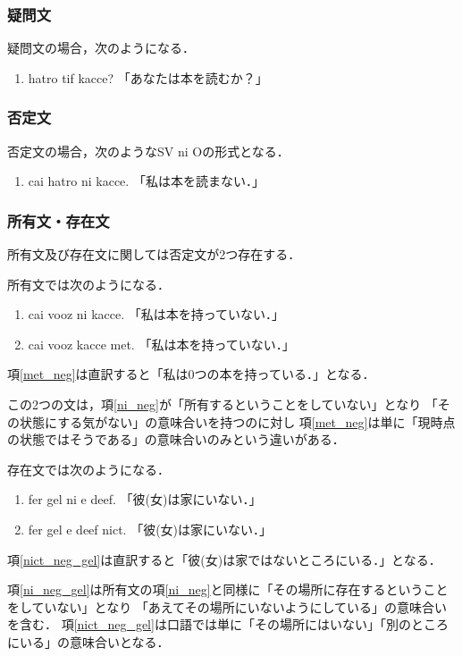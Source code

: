 \documentclass[a4paper,xelatex,ja=standard]{bxjsarticle}
\begin{document}
\subsubsection{疑問文}
疑問文の場合，次のようになる．
\begin{enumerate}
 \item hatro tif kacce? 「あなたは本を読むか？」
\end{enumerate}

\subsubsection{否定文}
否定文の場合，次のようなSV ni Oの形式となる．
\begin{enumerate}
 \item cai hatro ni kacce. 「私は本を読まない．」
\end{enumerate}

\subsubsection{所有文・存在文}
所有文及び存在文に関しては否定文が2つ存在する．

所有文では次のようになる．
\begin{enumerate}
 \item cai vooz ni kacce. 「私は本を持っていない．」 \label{ni_neg}
 \item cai vooz kacce met. 「私は本を持っていない．」\label{met_neg}
\end{enumerate}
項\ref{met_neg}は直訳すると「私は0つの本を持っている．」となる．

この2つの文は，項\ref{ni_neg}が「所有するということをしていない」となり
「その状態にする気がない」の意味合いを持つのに対し
項\ref{met_neg}は単に「現時点の状態ではそうである」の意味合いのみという違いがある．

存在文では次のようになる．
\begin{enumerate}
 \item fer gel ni e deef. 「彼(女)は家にいない．」\label{ni_neg_gel}
 \item fer gel e deef nict. 「彼(女)は家にいない．」\label{nict_neg_gel}
\end{enumerate}
項\ref{nict_neg_gel}は直訳すると「彼(女)は家ではないところにいる．」となる．

項\ref{ni_neg_gel}は所有文の項\ref{ni_neg}と同様に「その場所に存在するということをしていない」となり
「あえてその場所にいないようにしている」の意味合いを含む．
項\ref{nict_neg_gel}は口語では単に「その場所にはいない」「別のところにいる」の意味合いとなる．
\end{document}
